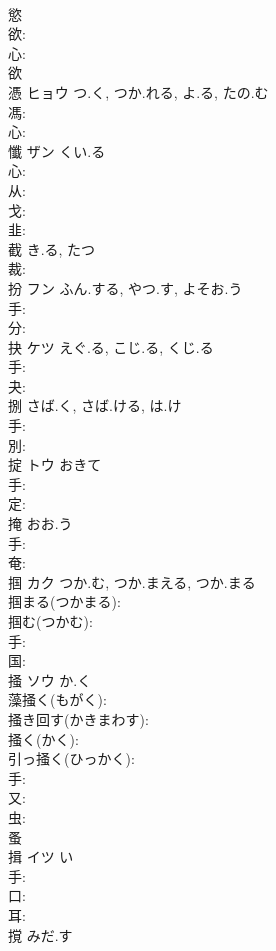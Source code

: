 \documentclass[8pt]{extreport}
\begin{document}
\begin{CJK}{UTF8}{min}
\\	慾						
\\	欲: 
\\	心: 
\\	欲 
\\	憑	ヒョウ	つ.く, つか.れる, よ.る, たの.む		
\\	馮: 
\\	心: 
\\	懺	ザン	くい.る				
\\	心: 
\\	从: 
\\	戈: 
\\	韭: 
\\	截		き.る, たつ				
\\	裁: 
\\	扮	フン	ふん.する, やつ.す, よそお.う		
\\	手: 
\\	分: 
\\	抉	ケツ	えぐ.る, こじ.る, くじ.る		
\\	手: 
\\	夬: 
\\	捌		さば.く, さば.ける, は.け				
\\	手: 
\\	別: 
\\	掟	トウ	おきて		
\\	手: 
\\	定: 
\\	掩		おお.う				
\\	手: 
\\	奄: 
\\	掴	カク	つか.む, つか.まえる, つか.まる		
\\	掴まる(つかまる): 
\\	掴む(つかむ): 
\\	手: 
\\	国: 
\\	掻	ソウ	か.く		
\\	藻掻く(もがく): 
\\	掻き回す(かきまわす): 
\\	掻く(かく): 
\\	引っ掻く(ひっかく): 
\\	手: 
\\	又: 
\\	虫: 
\\	蚤 
\\	揖	イツ		い	
\\	手: 
\\	口: 
\\	耳: 
\\	撹		みだ.す				

\end{CJK}
\end{document}
